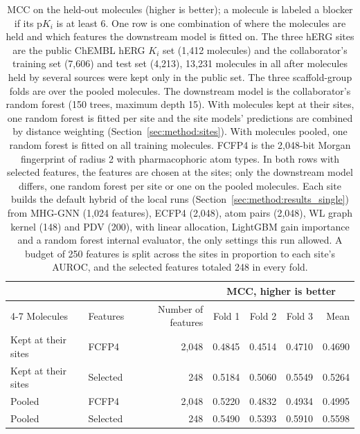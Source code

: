 \begin{table}[htbp]
\centering
\small
\begin{tabular}{@{}llrrrrr@{}}
\toprule
 & & & \multicolumn{4}{c}{MCC, higher is better} \\
\cmidrule(l){4-7}
Molecules & Features & Number of features & Fold 1 & Fold 2 & Fold 3 & Mean \\
\midrule
Kept at their sites & FCFP4 & 2,048 & 0.4845 & 0.4514 & 0.4710 & 0.4690 \\
Kept at their sites & Selected & 248 & 0.5184 & 0.5060 & 0.5549 & 0.5264 \\
Pooled & FCFP4 & 2,048 & 0.5220 & 0.4832 & 0.4934 & 0.4995 \\
Pooled & Selected & 248 & 0.5490 & 0.5393 & 0.5910 & 0.5598 \\
\bottomrule
\end{tabular}
\caption[MCC with molecules kept at three hERG sites or pooled]{MCC on the held-out molecules (higher is better); a molecule is labeled a blocker if its p$K_i$ is at least 6. One row is one combination of where the molecules are held and which features the downstream model is fitted on. The three hERG sites are the public ChEMBL hERG $K_i$ set (1,412 molecules) and the collaborator's training set (7,606) and test set (4,213), 13,231 molecules in all after molecules held by several sources were kept only in the public set. The three scaffold-group folds are over the pooled molecules. The downstream model is the collaborator's random forest (150 trees, maximum depth 15). With molecules kept at their sites, one random forest is fitted per site and the site models' predictions are combined by distance weighting (Section~\ref{sec:method:sites}). With molecules pooled, one random forest is fitted on all training molecules. FCFP4 is the 2,048-bit Morgan fingerprint of radius 2 with pharmacophoric atom types. In both rows with selected features, the features are chosen at the sites; only the downstream model differs, one random forest per site or one on the pooled molecules. Each site builds the default hybrid of the local runs (Section~\ref{sec:method:results_single}) from MHG-GNN (1,024 features), ECFP4 (2,048), atom pairs (2,048), WL graph kernel (148) and PDV (200), with linear allocation, LightGBM gain importance and a random forest internal evaluator, the only settings this run allowed. A budget of 250 features is split across the sites in proportion to each site's AUROC, and the selected features totaled 248 in every fold.}
\label{tab:prelim_sites}
\end{table}


